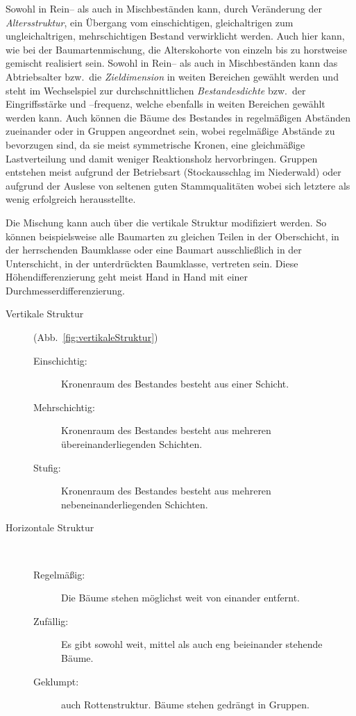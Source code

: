 \documentclass[twocolumn]{scrartcl}
\begin{document}
Sowohl in Rein-- als auch in Mischbeständen kann, durch Veränderung
der \emph{Altersstruktur}, ein Übergang vom einschichtigen,
gleichaltrigen zum ungleichaltrigen, mehrschichtigen Bestand
verwirklicht werden. Auch hier kann, wie bei der Baumartenmischung,
die Alterskohorte von einzeln bis zu horstweise gemischt realisiert
sein. Sowohl in Rein-- als auch in Mischbeständen kann das
Abtriebsalter bzw.\ die \emph{Zieldimension} in weiten Bereichen
gewählt werden und steht im Wechselspiel zur durchschnittlichen
\emph{Bestandesdichte} bzw.\ der Eingriffsstärke und --frequenz,
welche ebenfalls in weiten Bereichen gewählt werden kann. Auch können
die Bäume des Bestandes in regelmäßigen Abständen zueinander oder in
Gruppen angeordnet sein, wobei regelmäßige Abstände zu bevorzugen
sind, da sie meist symmetrische Kronen, eine gleichmäßige
Lastverteilung und damit weniger Reaktionsholz hervorbringen. Gruppen
entstehen meist aufgrund der Betriebsart (Stockausschlag im
Niederwald) oder aufgrund der Auslese von seltenen guten
Stammqualitäten
\citep{kato1969Buchendurchforstung,kato1988Gruppendurchforstung} wobei
sich letztere als wenig erfolgreich herausstellte.

Die Mischung kann auch über die vertikale Struktur modifiziert
werden. So können beispielsweise alle Baumarten zu gleichen Teilen in
der Oberschicht, in der herrschenden Baumklasse oder eine Baumart
ausschließlich in der Unterschicht, in der unterdrückten Baumklasse,
vertreten sein. Diese Höhendifferenzierung geht meist Hand in Hand mit
einer Durchmesserdifferenzierung.

\begin{description}
\item[Vertikale Struktur] (Abb.~\ref{fig:vertikaleStruktur})
  \begin{description}
  \item[Einschichtig:] Kronenraum des Bestandes besteht aus einer Schicht.
  \item[Mehrschichtig:] Kronenraum des Bestandes besteht aus mehreren übereinanderliegenden Schichten.
  \item[Stufig:] Kronenraum des Bestandes besteht aus mehreren nebeneinanderliegenden Schichten.
  \end{description}
\item[Horizontale Struktur]~
  \begin{description}
  \item[Regelmäßig:] Die Bäume stehen möglichst weit von einander entfernt.
  \item[Zufällig:] Es gibt sowohl weit, mittel als auch eng beieinander stehende Bäume.
  \item[Geklumpt:] auch Rottenstruktur. Bäume stehen gedrängt in Gruppen.
  \end{description}
\end{description}
\end{document}
